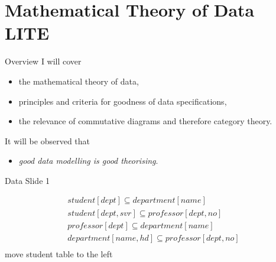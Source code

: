 \section{Mathematical Theory of Data LITE}

\begin{frame}{Overview}
I will cover
\begin{itemize}
\item the mathematical theory of data,
\item principles and criteria for goodness of data specifications,
\item the relevance of commutative diagrams and therefore category theory.
\end{itemize}



\medskip
\pause
It will be observed that
\begin{itemize}
\item \textit{good data modelling is good theorising}.
\end{itemize}
\end{frame}

\iffalse
\subsection{Example}
\begin{frame}{Example -- LCMSMS Data}
\scalebox{0.2}{

}
\end{frame}
\fi



\newcommand{\studentDeptInclusionDependency}
{student[dept] \subseteq department[name]}
\newcommand{\studentSupervisorInclusionDependency}
{student[dept,svr] \subseteq professor[dept,no]}
\newcommand{\professorDeptInclusionDependency}
{professor[dept] \subseteq department[name]}
\newcommand{\headOfDeptInclusionDependency}
{department[name,hd]  \subseteq professor[dept,no]}


\begin{frame}{Data Slide 1}

\begin{align*}
\studentDeptInclusionDependency  \\
\studentSupervisorInclusionDependency\\
\professorDeptInclusionDependency\\
\headOfDeptInclusionDependency  \\
\end{align*}
{\small{move student table to the left}}
\end{frame}


